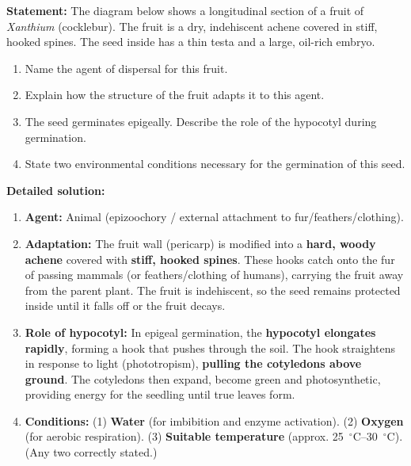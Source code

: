 \documentclass[11pt]{article}
\newcounter{popsec}
\newcounter{popsub}
\newcommand{\courssub}[1]{%
  \stepcounter{popsub}%
  \par\vspace{9pt}\noindent{\popxbold\fontsize{11.5}{13}\selectfont\color{popink}{\color{poporange}\thepopsec.\thepopsub}\hspace{6pt}#1}\par\nopagebreak\vspace{4pt}
}
\begin{document}
\begin{exoresolu}
\textbf{Statement:} The diagram below shows a longitudinal section of a fruit of \emph{Xanthium} (cocklebur). The fruit is a dry, indehiscent achene covered in stiff, hooked spines. The seed inside has a thin testa and a large, oil-rich embryo.

\begin{enumerate}
\item Name the agent of dispersal for this fruit.
\item Explain how the structure of the fruit adapts it to this agent.
\item The seed germinates epigeally. Describe the role of the hypocotyl during germination.
\item State two environmental conditions necessary for the germination of this seed.
\end{enumerate}

\tcblower
\textbf{Detailed solution:}
\begin{enumerate}
\item \textbf{Agent:} Animal (epizoochory / external attachment to fur/feathers/clothing).
\item \textbf{Adaptation:} The fruit wall (pericarp) is modified into a \textbf{hard, woody achene} covered with \textbf{stiff, hooked spines}. These hooks catch onto the fur of passing mammals (or feathers/clothing of humans), carrying the fruit away from the parent plant. The fruit is indehiscent, so the seed remains protected inside until it falls off or the fruit decays.
\item \textbf{Role of hypocotyl:} In epigeal germination, the \textbf{hypocotyl elongates rapidly}, forming a hook that pushes through the soil. The hook straightens in response to light (phototropism), \textbf{pulling the cotyledons above ground}. The cotyledons then expand, become green and photosynthetic, providing energy for the seedling until true leaves form.
\item \textbf{Conditions:} (1) \textbf{Water} (for imbibition and enzyme activation). (2) \textbf{Oxygen} (for aerobic respiration). (3) \textbf{Suitable temperature} (approx. \SI{25}{\ensuremath{{}^{\circ}\mathrm{C}}}--\SI{30}{\ensuremath{{}^{\circ}\mathrm{C}}}). (Any two correctly stated.)
\end{enumerate}
\end{exoresolu}

\courssub{Summary of Key Points}
\end{document}
